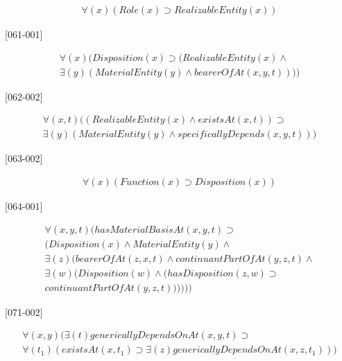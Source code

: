 \documentclass{article}
\begin{document}
\begin{flushright}
[060-002] 

\begin{equation}
\begin{split}
{\forall}(x)(Role(x) \supset RealizableEntity(x))
\end{split}
\end{equation}

[061-001] 

\begin{equation}
\begin{split}
{\forall}(x)(Disposition(x) \supset (RealizableEntity(x) \wedge \\
{\exists}(y)(MaterialEntity(y) \wedge bearerOfAt(x, y, t))))
\end{split}
\end{equation}

[062-002] 

\begin{equation}
\begin{split}
{\forall}(x, t)((RealizableEntity(x) \wedge existsAt(x, t)) \supset \\
{\exists}(y)(MaterialEntity(y) \wedge specificallyDepends(x, y, t)))
\end{split}
\end{equation}

[063-002] 

\begin{equation}
\begin{split}
{\forall}(x)(Function(x) \supset Disposition(x))
\end{split}
\end{equation}

[064-001] 

\begin{equation}
\begin{split}
{\forall}(x, y, t)(hasMaterialBasisAt(x, y, t) \supset \\
(Disposition(x) \wedge MaterialEntity(y) \wedge \\
{\exists}(z)(bearerOfAt(z, x, t) \wedge continuantPartOfAt(y, z, t) \wedge \\
{\exists}(w)(Disposition(w) \wedge (hasDisposition(z, w) \supset \\
continuantPartOfAt(y, z, t))))))
\end{split}
\end{equation}

[071-002] 

\begin{equation}
\begin{split}
{\forall}(x, y)({\exists}(t)genericallyDependsOnAt(x, y, t) \supset \\
{\forall}(t_1)(existsAt(x, t_1) \supset {\exists}(z)genericallyDependsOnAt(x, z, t_1)))
\end{split}
\end{equation}


\end{flushright}
\end{document}
